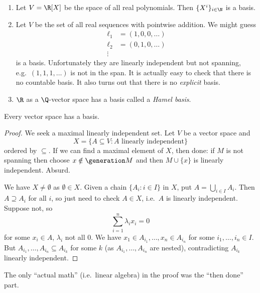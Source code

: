 \documentclass[a4paper]{article}
\begin{document}
\begin{eg}\leavevmode
  \begin{enumerate}
  \item Let \(V = \R[X]\) be the space of all real polynomials. Then \(\{X^i\}_{i \in \N}\) is a basis.
  \item Let \(V\) be the set of all real sequences with pointwise addition. We might guess
    \begin{align*}
      \ell_1 &= (1, 0, 0, \dots) \\
      \ell_2 &= (0, 1, 0, \dots) \\
      \vdots
    \end{align*}
    is a basis. Unfortunately they are linearly independent but not spanning, e.g.\ \((1, 1, 1, \dots)\) is not in the span. It is actually easy to check that there is no countable basis. It also turns out that there is no \emph{explicit} basis.
  \item \(\R\) as a \(\Q\)-vector space has a basis called a \emph{Hamel basis}.
  \end{enumerate}
\end{eg}

\begin{theorem}
  Every vector space has a basis.
\end{theorem}

\begin{proof}
  We seek a maximal linearly independent set. Let \(V\) be a vector space and
  \[
    X = \{A \subseteq V: A \text{ linearly independent}\}
  \]
  ordered by \(\subseteq\). If we can find a maximal element of \(X\), then done: if \(M\) is not spanning then choose \(x \notin \generation M\) and then \(M \cup \{x\}\) is linearly independent. Absurd.

  We have \(X \neq \emptyset\) as \(\emptyset \in X\). Given a chain \(\{A_i: i \in I\}\) in \(X\), put \(A = \bigcup_{i \in I} A_i\). Then \(A \supseteq A_i\) for all \(i\), so just need to check \(A \in X\), i.e.\ \(A\) is linearly independent. Suppose not, so
  \[
    \sum_{i = 1}^n \lambda_ix_i = 0
  \]
  for some \(x_i \in A\), \(\lambda_i\) not all \(0\). We have \(x_1 \in A_{i_1}, \dots, x_n \in A_{i_n}\) for some \(i_1, \dots, i_n \in I\). But \(A_{i_1}, \dots, A_{i_n} \subseteq A_{i_k}\) for some \(k\) (as \(A_{i_1}, \dots, A_{i_n}\) are nested), contradicting \(A_{i_k}\) linearly independent.
\end{proof}

\begin{note}
  The only ``actual math'' (i.e.\ linear algebra) in the proof was the ``then done'' part.
\end{note}
\end{document}
